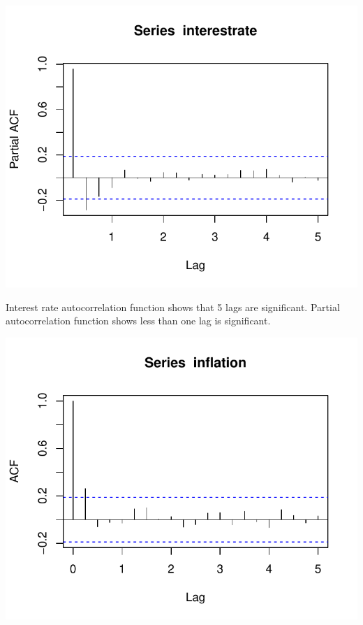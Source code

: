 \documentclass[11pt,preprint, authoryear]{elsarticle}
\numberwithin{equation}{section}
\numberwithin{figure}{section}
\numberwithin{table}{section}
\begin{document}
\begin{center}\includegraphics{README_files/figure-latex/unnamed-chunk-29-2} \end{center}

Interest rate autocorrelation function shows that 5 lags are
significant. Partial autocorrelation function shows less than one lag is
significant.

\begin{center}\includegraphics{README_files/figure-latex/unnamed-chunk-30-1} \end{center}
\end{document}
